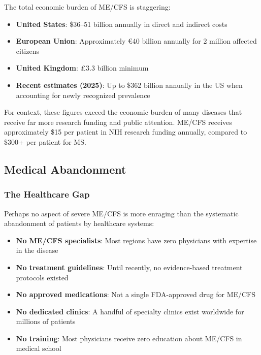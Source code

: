 The total economic burden of ME/CFS is staggering:

\begin{itemize}
    \item \textbf{United States}: \$36--51 billion annually in direct and indirect costs
    \item \textbf{European Union}: Approximately \euro 40 billion annually for 2 million affected citizens
    \item \textbf{United Kingdom}: \pounds 3.3 billion minimum
    \item \textbf{Recent estimates (2025)}: Up to \$362 billion annually in the US when accounting for newly recognized prevalence
\end{itemize}

For context, these figures exceed the economic burden of many diseases that receive far more research funding and public attention. ME/CFS receives approximately \$15 per patient in NIH research funding annually, compared to \$300+ per patient for MS.

\subsection{Medical Abandonment}
\label{sec:medical-abandonment}

\subsubsection{The Healthcare Gap}
\label{subsec:healthcare-gap}

Perhaps no aspect of severe ME/CFS is more enraging than the systematic abandonment of patients by healthcare systems:

\begin{itemize}
    \item \textbf{No ME/CFS specialists}: Most regions have zero physicians with expertise in the disease
    \item \textbf{No treatment guidelines}: Until recently, no evidence-based treatment protocols existed
    \item \textbf{No approved medications}: Not a single FDA-approved drug for ME/CFS
    \item \textbf{No dedicated clinics}: A handful of specialty clinics exist worldwide for millions of patients
    \item \textbf{No training}: Most physicians receive zero education about ME/CFS in medical school
\end{itemize}

